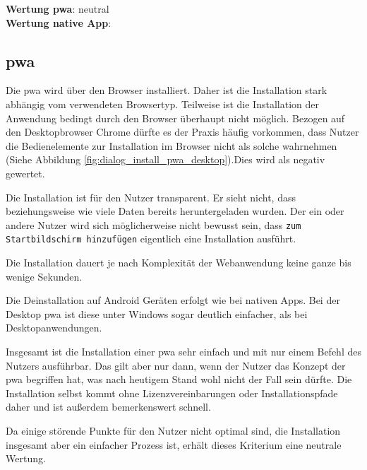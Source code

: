 \textbf{Wertung \ac{pwa}}: neutral \\
\textbf{Wertung native App}:  \\

\subsection{\ac{pwa}}
Die \ac{pwa} wird über den Browser installiert. Daher ist die Installation stark abhängig vom verwendeten Browsertyp. Teilweise ist die Installation der Anwendung bedingt durch den Browser überhaupt nicht möglich. Bezogen auf den Desktopbrowser Chrome dürfte es der Praxis häufig vorkommen, dass Nutzer die Bedienelemente zur Installation im Browser nicht als solche wahrnehmen (Siehe Abbildung \ref{fig:dialog_install_pwa_desktop}).Dies wird als negativ gewertet.

Die Installation ist für den Nutzer transparent. Er sieht nicht, dass beziehungsweise wie viele Daten bereits heruntergeladen wurden. Der ein oder andere Nutzer wird sich möglicherweise nicht bewusst sein, dass \texttt{zum Startbildschirm hinzufügen} eigentlich eine Installation ausführt.

Die Installation dauert je nach Komplexität der Webanwendung keine ganze bis wenige Sekunden.

Die Deinstallation auf Android Geräten erfolgt wie bei nativen Apps. Bei der Desktop \ac{pwa} ist diese unter Windows sogar deutlich einfacher, als bei Desktopanwendungen.

Insgesamt ist die Installation einer \ac{pwa} sehr einfach und mit nur einem Befehl des Nutzers ausführbar. Das gilt aber nur dann, wenn der Nutzer das Konzept der \ac{pwa} begriffen hat, was nach heutigem Stand wohl nicht der Fall sein dürfte. Die Installation selbst kommt ohne Lizenzvereinbarungen oder Installationspfade daher und ist außerdem bemerkenswert schnell.

Da einige störende Punkte für den Nutzer nicht optimal sind, die Installation insgesamt aber ein einfacher Prozess ist, erhält dieses Kriterium eine neutrale Wertung.
